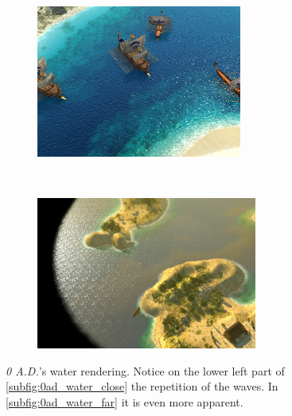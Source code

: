 \begin{figure}[h!]
    \centering
    \begin{subfigure}[h]{\textwidth}
        \centering
        \includegraphics[height=5cm]{figures/0ad_water-specular.jpg}
        \label{subfig:0ad_water_close}
    \end{subfigure}\\%
    \begin{subfigure}[h]{\textwidth}
        \centering
        \includegraphics[height=5cm]{figures/0ad_cycladic_arcgipelago_6.jpg}
        \label{subfig:0ad_water_far}
    \end{subfigure}
    \caption{\textit{0 A.D.}'s water rendering. Notice on the lower left part
        of \autoref{subfig:0ad_water_close} the repetition of the waves.
        In \autoref{subfig:0ad_water_far} it is even more apparent.}\label{fig:0ad_water}
\end{figure}

